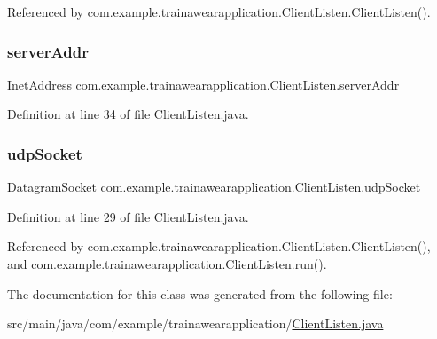 Referenced by com.\+example.\+trainawearapplication.\+Client\+Listen.\+Client\+Listen().

\mbox{\label{classcom_1_1example_1_1trainawearapplication_1_1_client_listen_abc9e0b9f60e38782a9aa64dde9b43273}} 
\subsubsection{\texorpdfstring{serverAddr}{serverAddr}}
{\footnotesize\ttfamily Inet\+Address com.\+example.\+trainawearapplication.\+Client\+Listen.\+server\+Addr}



Definition at line 34 of file Client\+Listen.\+java.

\mbox{\label{classcom_1_1example_1_1trainawearapplication_1_1_client_listen_a008375f58e870216d43730ef43964b61}} 
\subsubsection{\texorpdfstring{udpSocket}{udpSocket}}
{\footnotesize\ttfamily Datagram\+Socket com.\+example.\+trainawearapplication.\+Client\+Listen.\+udp\+Socket\hspace{0.3cm}{\ttfamily [private]}}



Definition at line 29 of file Client\+Listen.\+java.



Referenced by com.\+example.\+trainawearapplication.\+Client\+Listen.\+Client\+Listen(), and com.\+example.\+trainawearapplication.\+Client\+Listen.\+run().



The documentation for this class was generated from the following file\+:\begin{DoxyCompactItemize}
\item 
src/main/java/com/example/trainawearapplication/\mbox{\hyperlink{_client_listen_8java}{Client\+Listen.\+java}}\end{DoxyCompactItemize}
